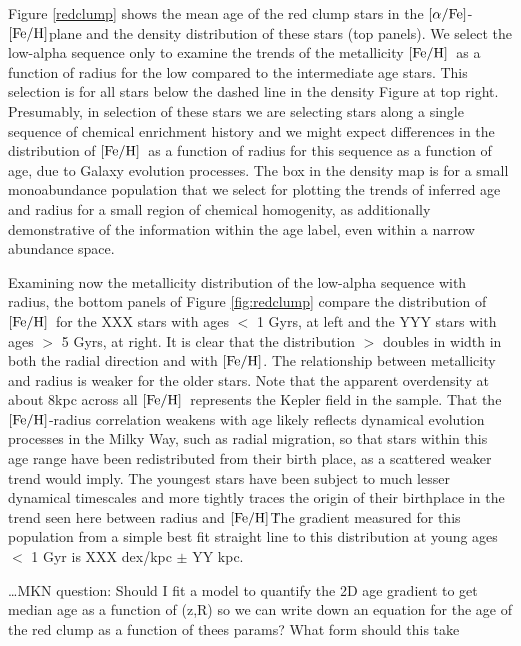 \documentclass[12pt, preprint]{aastex}
\newcommand{\feh}{\mbox{$\rm [Fe/H]$}}
\newcommand{\alphafe}{\mbox{$\rm [\alpha/Fe]$}}
\begin{document}
Figure \ref{redclump} shows the mean age of the red clump stars in the \alphafe-\feh plane and the density distribution of these stars (top panels).  We select the low-alpha sequence only to examine the trends of the metallicity \feh\ as a function of radius for the low compared to the intermediate age stars. This selection is for all stars below the dashed line in the density Figure at top right. Presumably, in selection of these stars we are selecting stars along a single sequence of chemical enrichment history and we might expect differences in the distribution of \feh\ as a function of radius for this sequence as a function of age, due to Galaxy evolution processes. The box in the density map is for a small monoabundance population that we select for plotting the trends of inferred age and radius for a small region of chemical homogenity, as additionally demonstrative of the information within the age label, even within a narrow abundance space. 

Examining now the metallicity distribution of the low-alpha sequence with radius, the bottom panels of Figure \ref{fig:redclump} compare the distribution of \feh\ for the XXX stars with ages $<$ 1 Gyrs, at left and the YYY stars with ages $>$ 5 Gyrs, at right. It is clear that the distribution $>$ doubles in width in both the radial direction and with \feh. The relationship between metallicity and radius is weaker for the older stars. Note that the apparent overdensity at about 8kpc across all \feh\ represents the Kepler field in the sample. That the \feh-radius correlation weakens with age likely reflects dynamical evolution processes in the Milky Way, such as radial migration, so that stars within this age range have been redistributed from their birth place, as a scattered weaker trend would imply. The youngest stars have been subject to much lesser dynamical timescales and more tightly traces the origin of their birthplace in the trend seen here between radius and \feh\. The gradient measured for this population from a simple best fit straight line to this distribution at young ages $<$ 1 Gyr is XXX dex/kpc $\pm$ YY kpc. 

\ldots MKN question: Should I fit a model to quantify the 2D age gradient to get median age as a function of (z,R) so we can write down an equation for the age of the red clump as a function of thees params? What form should this take

\end{document}
